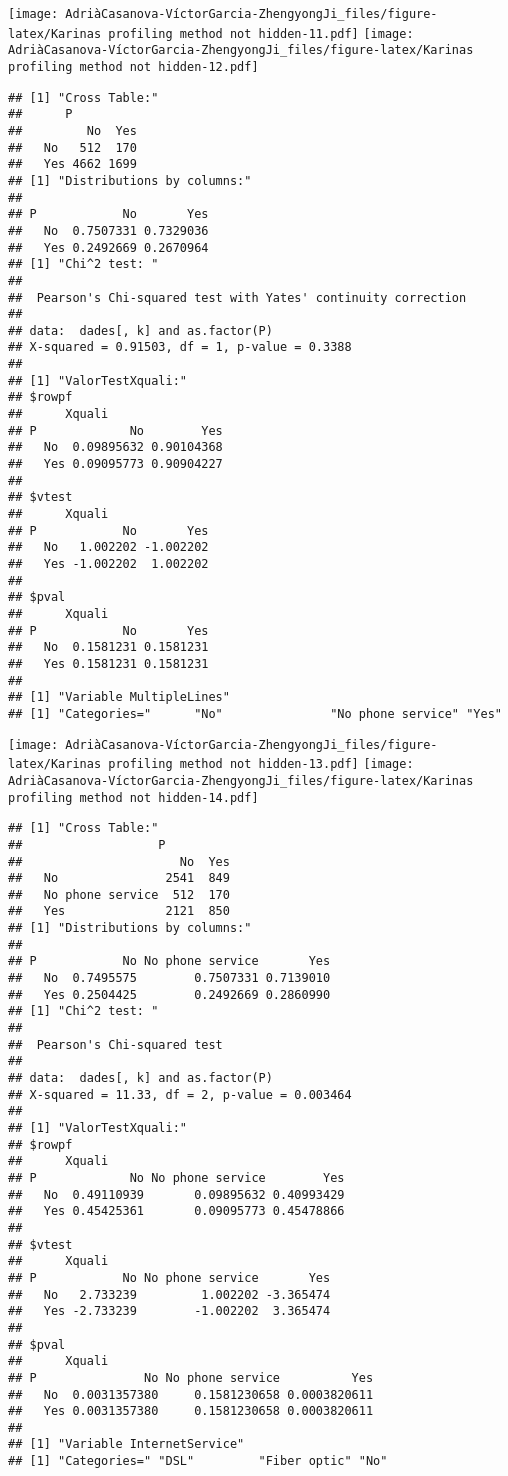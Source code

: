 \documentclass[
]{article}
\begin{document}
\texttt{[image: AdriàCasanova-VíctorGarcia-ZhengyongJi\_files/figure-latex/Karinas profiling method not hidden-11.pdf]}
\texttt{[image: AdriàCasanova-VíctorGarcia-ZhengyongJi\_files/figure-latex/Karinas profiling method not hidden-12.pdf]}

\begin{verbatim}
## [1] "Cross Table:"
##      P
##         No  Yes
##   No   512  170
##   Yes 4662 1699
## [1] "Distributions by columns:"
##      
## P            No       Yes
##   No  0.7507331 0.7329036
##   Yes 0.2492669 0.2670964
## [1] "Chi^2 test: "
## 
##  Pearson's Chi-squared test with Yates' continuity correction
## 
## data:  dades[, k] and as.factor(P)
## X-squared = 0.91503, df = 1, p-value = 0.3388
## 
## [1] "ValorTestXquali:"
## $rowpf
##      Xquali
## P             No        Yes
##   No  0.09895632 0.90104368
##   Yes 0.09095773 0.90904227
## 
## $vtest
##      Xquali
## P            No       Yes
##   No   1.002202 -1.002202
##   Yes -1.002202  1.002202
## 
## $pval
##      Xquali
## P            No       Yes
##   No  0.1581231 0.1581231
##   Yes 0.1581231 0.1581231
## 
## [1] "Variable MultipleLines"
## [1] "Categories="      "No"               "No phone service" "Yes"
\end{verbatim}

\texttt{[image: AdriàCasanova-VíctorGarcia-ZhengyongJi\_files/figure-latex/Karinas profiling method not hidden-13.pdf]}
\texttt{[image: AdriàCasanova-VíctorGarcia-ZhengyongJi\_files/figure-latex/Karinas profiling method not hidden-14.pdf]}

\begin{verbatim}
## [1] "Cross Table:"
##                   P
##                      No  Yes
##   No               2541  849
##   No phone service  512  170
##   Yes              2121  850
## [1] "Distributions by columns:"
##      
## P            No No phone service       Yes
##   No  0.7495575        0.7507331 0.7139010
##   Yes 0.2504425        0.2492669 0.2860990
## [1] "Chi^2 test: "
## 
##  Pearson's Chi-squared test
## 
## data:  dades[, k] and as.factor(P)
## X-squared = 11.33, df = 2, p-value = 0.003464
## 
## [1] "ValorTestXquali:"
## $rowpf
##      Xquali
## P             No No phone service        Yes
##   No  0.49110939       0.09895632 0.40993429
##   Yes 0.45425361       0.09095773 0.45478866
## 
## $vtest
##      Xquali
## P            No No phone service       Yes
##   No   2.733239         1.002202 -3.365474
##   Yes -2.733239        -1.002202  3.365474
## 
## $pval
##      Xquali
## P               No No phone service          Yes
##   No  0.0031357380     0.1581230658 0.0003820611
##   Yes 0.0031357380     0.1581230658 0.0003820611
## 
## [1] "Variable InternetService"
## [1] "Categories=" "DSL"         "Fiber optic" "No"
\end{verbatim}
\end{document}
